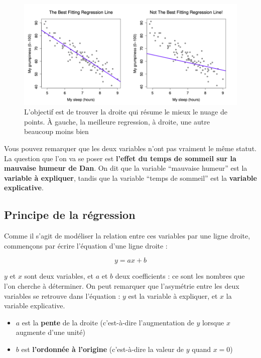 \documentclass[
  french,
]{book}
\providecommand{\tightlist}{%
  \setlength{\itemsep}{0pt}\setlength{\parskip}{0pt}}
\begin{document}
\begin{figure}
\centering
\includegraphics{images/regressionline.png}
\caption{L'objectif est de trouver la droite qui résume le mieux le nuage de
points. À gauche, la meilleure regression, à droite, une autre beaucoup
moins bien}
\end{figure}

Vous pouvez remarquer que les deux variables n'ont pas vraiment le même
statut. La question que l'on va se poser est \textbf{l'effet du temps de sommeil sur la mauvaise humeur de Dan}. On dit que la variable ``mauvaise humeur''
est la \textbf{variable à expliquer}, tandis que la variable ``temps de sommeil''
est la \textbf{variable explicative}.

\hypertarget{principe-de-la-ruxe9gression}{%
\subsection{Principe de la régression}\label{principe-de-la-ruxe9gression}}

Comme il s'agit de modéliser la relation entre ces variables par une ligne droite, commençons par écrire l'équation d'une ligne droite :

\[ y = ax + b \]

\(y\) et \(x\) sont deux variables, et \(a\) et \(b\) deux coefficients : ce sont les nombres que l'on cherche à déterminer. On peut remarquer que l'asymétrie entre les deux variables se retrouve dans l'équation : \(y\) est la variable à expliquer, et \(x\) la variable explicative.

\begin{itemize}
\tightlist
\item
  \(a\) est la \textbf{pente} de la droite (c'est-à-dire l'augmentation de
  \(y\) lorsque \(x\) augmente d'une unité)
\item
  \(b\) est \textbf{l'ordonnée à l'origine} (c'est-à-dire la valeur de \(y\)
  quand \(x = 0\))
\end{itemize}
\end{document}
